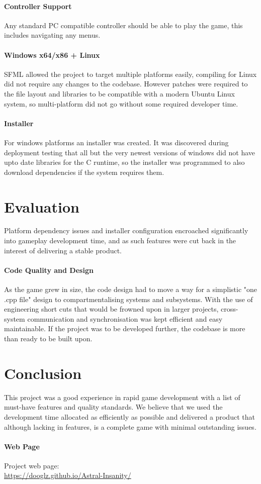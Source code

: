 \documentclass[conference,backref=page]{acmsiggraph}
\begin{document}
\paragraph{Controller Support}
Any standard PC compatible controller should be able to play the game, this includes navigating any menus.

\paragraph{Windows x64/x86 + Linux }
SFML allowed the project to target multiple platforms easily, compiling for Linux did not require any changes to the codebase. However patches were required to the file layout and libraries to be compatible with a modern Ubuntu Linux system, so multi-platform did not go without some required developer time.
 
\paragraph{Installer}
For windows platforms an installer was created. It was discovered during deployment testing that all but the very newest versions of windows did not have upto date libraries for the C runtime, so the installer was programmed to also download dependencies if the system requires them.
 
\section{Evaluation}
Platform dependency issues and installer configuration encroached significantly into gameplay development time, and as such features were cut back in the interest of delivering a stable product.
\paragraph{Code Quality and Design}
As the game grew in size, the code design had to move a way for a simplistic "one .cpp file" design to compartmentalising systems and subsystems. With the use of engineering short cuts that would be frowned upon in larger projects, cross-system communication and synchronisation was kept efficient and easy maintainable. If the project was to be developed further, the codebase is more than ready to be built upon.

\section{Conclusion}
This project was a good experience in rapid game development with a list of must-have features and quality standards. We believe that we used the development time allocated as efficiently as possible and delivered a product that although lacking in features, is a complete game with minimal outstanding issues.

\paragraph{Web Page}
Project web page: \\
\url{https://dooglz.github.io/Astral-Insanity/}
\end{document}
